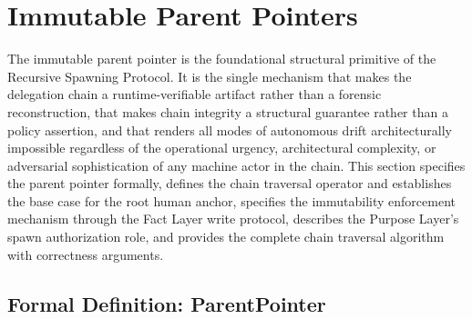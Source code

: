 \section{Immutable Parent Pointers}
\label{sec:immutable-parent-pointers}

The immutable parent pointer is the foundational structural primitive of the Recursive Spawning Protocol. It is the single mechanism that makes the delegation chain a runtime-verifiable artifact rather than a forensic reconstruction, that makes chain integrity a structural guarantee rather than a policy assertion, and that renders all modes of autonomous drift architecturally impossible regardless of the operational urgency, architectural complexity, or adversarial sophistication of any machine actor in the chain. This section specifies the parent pointer formally, defines the chain traversal operator and establishes the base case for the root human anchor, specifies the immutability enforcement mechanism through the Fact Layer write protocol, describes the Purpose Layer's spawn authorization role, and provides the complete chain traversal algorithm with correctness arguments.

\subsection{Formal Definition: ParentPointer}
\label{sec:parent-pointer-definition}

